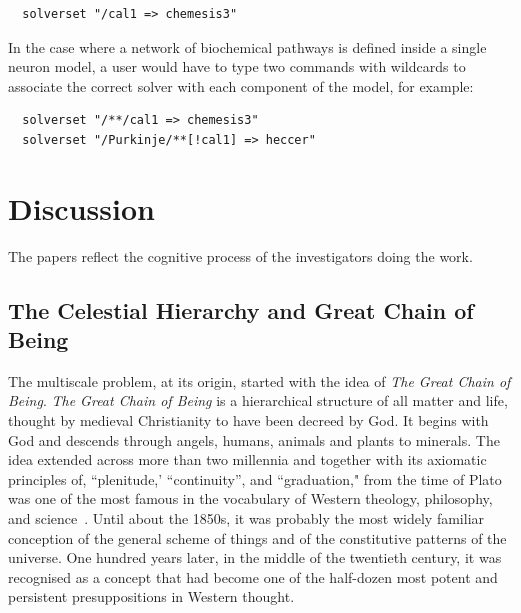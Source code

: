 \documentclass[11pt,3p,twocolumn]{JMN}
\begin{document}
\begin{tiny}
\begin{verbatim}
  solverset "/cal1 => chemesis3"
\end{verbatim}
\end{tiny}

In the case where a network of biochemical pathways is defined inside a single neuron model, a user would have to type two commands with wildcards to associate the correct solver with each component of the model, for example:

\begin{tiny}
\begin{verbatim}
  solverset "/**/cal1 => chemesis3"
  solverset "/Purkinje/**[!cal1] => heccer"
\end{verbatim}
\end{tiny}


\section{Discussion}

The papers reflect the cognitive process of the investigators doing the work.

\subsection{The Celestial Hierarchy and Great Chain of Being}
The multiscale problem, at its origin, started with the idea of {\it The Great Chain of Being}. {\it The Great Chain of Being} is a hierarchical structure of all matter and life, thought by medieval Christianity to have been decreed by God. It begins with God and descends through angels, humans, animals and plants to minerals. The idea extended across more than two millennia and together with its axiomatic principles of, ``plenitude,' ``continuity'', and ``graduation," from the time of Plato was one of the most famous in the vocabulary of Western theology, philosophy, and science~\citep{lovejoy48}. Until about the 1850s, it was probably the most widely familiar conception of the general scheme of things and of the constitutive patterns of the universe. One hundred years later, in the middle of the twentieth century, it was recognised as a concept that had become one of the half-dozen most potent and persistent presuppositions in Western thought.
\end{document}
